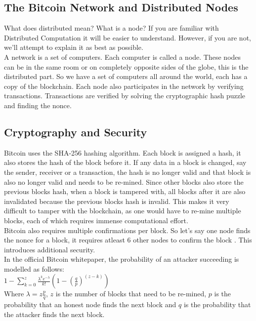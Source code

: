 \documentclass[11pt]{article} %
\begin{document}
\subsection{The Bitcoin Network and Distributed Nodes}{}
What does distributed mean? What is a node? If you are familiar with Distributed Computation it will be easier to understand. However, if you are not, we'll attempt to explain it as best as possible. \\

\noindent A network is a set of computers. Each computer is called a node. These nodes can be in the same room or on completely opposite sides of the globe, this is the distributed part. So we have a set of computers all around the world, each has a copy of the blockchain. Each node also participates in the network by verifying transactions. Transactions are verified by solving the cryptographic hash puzzle and finding the nonce.

\subsection{Cryptography and Security}{}
Bitcoin uses the SHA-256 hashing algorithm. Each block is assigned a hash, it also stores the hash of the block before it. If any data in a block is changed, say the sender, receiver or a transaction, the hash is no longer valid and that block is also no longer valid and needs to be re-mined. Since other blocks also store the previous blocks hash, when a block is tampered with, all blocks after it are also invalidated because the previous blocks hash is invalid. This makes it very difficult to tamper with the blockchain, as one would have to re-mine multiple blocks, each of which requires immense computational effort.\\

\noindent Bitcoin also requires multiple confirmations per block. So let's say one node finds the nonce for a block, it requires atleast 6 other nodes to confirm the block \cite{11}. This introduces additional security.\\

\noindent In the official Bitcoin whitepaper, the probability of an attacker succeeding is modelled as follows:\\

$1 - \sum_{k=0}^{z} \frac{ \lambda^{k} e^{-\lambda} } {k!} (1 - ({\frac{q}{p}}) ^ {(z-k)})$\\

Where $\lambda = z \frac{p}{q}$, $z$ is the number of blocks that need to be re-mined, $p$ is the probability that an honest node finds the next block and $q$ is the probability that the attacker finds the next block.\\
\end{document}
